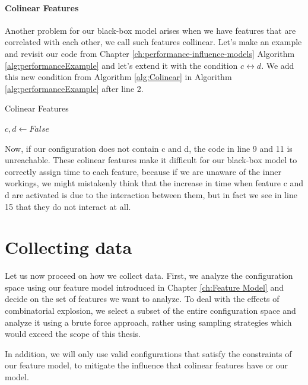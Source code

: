 \paragraph{Colinear Features}\label{ColinearF}
Another problem for our black-box model arises when we have features that are correlated with each other, we call such features collinear.
Let's make an example and revisit our code from Chapter \ref{ch:performance-influence-models} Algorithm \ref{alg:performanceExample} and let's
 extend it with the condition $c \leftrightarrow d$. We add this new condition from Algorithm \ref{alg:Colinear} in Algorithm 
\ref{alg:performanceExample} after line 2.

\begin{algorithm}
    \caption{Colinear Features \label{alg:Colinear}}
    \begin{algorithmic}[1]

        \State $c,d \gets False$
    \EndIf

    \end{algorithmic}
    \end{algorithm}

Now, if our configuration does not contain c and d, the code in line 9 and 11 is unreachable. These colinear features make it difficult 
for our black-box model to correctly assign time to each feature, because if we are unaware of the inner workings, we might mistakenly think
that the increase in time when feature c and d are activated is due to the interaction between them, but in fact we see in line
15 that they do not interact at all. %

\section{Collecting data}

Let us now proceed on how we collect data. First, we analyze the configuration space using our feature model introduced in Chapter \ref{ch:Feature Model}
and decide on the set of features we want to analyze. To deal with the effects of combinatorial explosion, we select a subset of the entire
configuration space and analyze it using a brute force approach, rather using sampling strategies which would exceed the scope of this
thesis.

In addition, we will only use valid configurations that satisfy the constraints of our feature model, to mitigate
the influence that colinear features have or our model.


